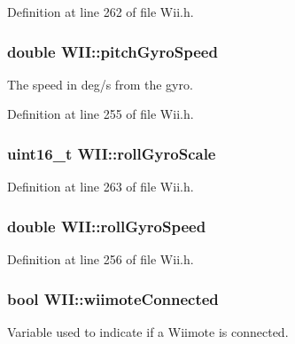 \-Definition at line 262 of file \-Wii.\-h.

\hypertarget{class_w_i_i_acfb290a86aa9a65dd4ae84d02e3c6ded}{
\subsubsection[{pitch\-Gyro\-Speed}]{\setlength{\rightskip}{0pt plus 5cm}double {\bf \-W\-I\-I\-::pitch\-Gyro\-Speed}}}\label{class_w_i_i_acfb290a86aa9a65dd4ae84d02e3c6ded}
\-The speed in deg/s from the gyro. 

\-Definition at line 255 of file \-Wii.\-h.

\hypertarget{class_w_i_i_a6c0971ae4c9ab752888a5871020c8331}{
\subsubsection[{roll\-Gyro\-Scale}]{\setlength{\rightskip}{0pt plus 5cm}uint16\-\_\-t {\bf \-W\-I\-I\-::roll\-Gyro\-Scale}}}\label{class_w_i_i_a6c0971ae4c9ab752888a5871020c8331}


\-Definition at line 263 of file \-Wii.\-h.

\hypertarget{class_w_i_i_a3fb552c6ad486e23434dcb347a2a4b84}{
\subsubsection[{roll\-Gyro\-Speed}]{\setlength{\rightskip}{0pt plus 5cm}double {\bf \-W\-I\-I\-::roll\-Gyro\-Speed}}}\label{class_w_i_i_a3fb552c6ad486e23434dcb347a2a4b84}


\-Definition at line 256 of file \-Wii.\-h.

\hypertarget{class_w_i_i_ae25a8ea1b0713801e0209e795b4596fa}{
\subsubsection[{wiimote\-Connected}]{\setlength{\rightskip}{0pt plus 5cm}bool {\bf \-W\-I\-I\-::wiimote\-Connected}}}\label{class_w_i_i_ae25a8ea1b0713801e0209e795b4596fa}
\-Variable used to indicate if a \-Wiimote is connected. 


